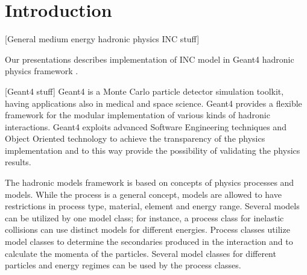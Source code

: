 \section{Introduction}

[General medium energy hadronic physics INC stuff]


Our presentations describes implementation of INC model in {\sc Geant4} hadronic physics framework \cite{}.

[Geant4 stuff]
Geant4 is a Monte Carlo particle detector simulation toolkit, having applications also in  medical and space
science. 
Geant4 provides a flexible framework for the modular implementation of
various kinds of hadronic interactions. 
Geant4 exploits advanced Software Engineering techniques and Object
Oriented technology to achieve the transparency of the physics
implementation and to this way provide the possibility of validating the
physics results. 

The hadronic models framework is based on concepts of physics
processes and models. While the process is a general concept, models
are allowed to have restrictions in process type, material, element
and energy range.  Several models can be utilized by one model class; for instance, a
process class for inelastic collisions can use distinct models for different energies.
Process classes utilize model classes to determine the
secondaries produced in the interaction and to calculate the momenta
of the particles.  Several model classes for different particles and
energy regimes can be used by the process classes.




